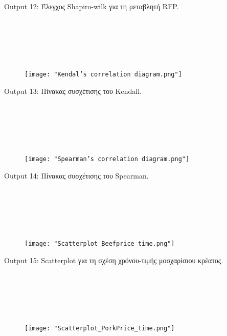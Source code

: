 \documentclass[10pt]{article}
\begin{document}
\begin{centering}

\renewcommand{\caption}{Output 12: }
\caption {Έλεγχος Shapiro-wilk για τη μεταβλητή RFP. }
\end{centering}

\

\

\
\begin{figure}[H]
    \centering
    \texttt{[image: "Kendal's correlation diagram.png"]}
    
    \label{fig:galaxy}
\end{figure}

\begin{centering}

\renewcommand{\caption}{Output 13: }
\caption {Πίνακας συσχέτισης του Κendall. }
\end{centering}
\

\

\
\begin{figure}[H]
    \centering
    \texttt{[image: "Spearman's correlation diagram.png"]}
    
    \label{fig:galaxy}
\end{figure}

\begin{centering}

\renewcommand{\caption}{Output 14: }
\caption {Πίνακας συσχέτισης του Spearman. }
\end{centering}
\

\

\

\begin{figure}[H]
    \centering
    \texttt{[image: "Scatterplot\_Beefprice\_time.png"]}
    
    \label{fig:galaxy}
\end{figure}

\begin{centering}

\renewcommand{\caption}{Output 15: }
\caption {Scatterplot για τη σχέση χρόνου-τιμής μοσχαρίσιου κρέατος. }
\end{centering}



\

\

\

\begin{figure}[H]
    \centering
    \texttt{[image: "Scatterplot\_PorkPrice\_time.png"]}
    
    \label{fig:galaxy}
\end{figure}
\end{document}
